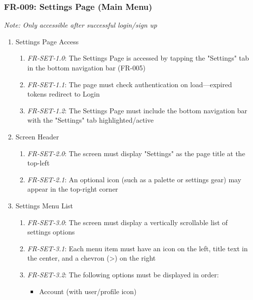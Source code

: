 \documentclass[conference]{IEEEtran}
\begin{document}
            \subsubsection{FR-009: Settings Page (Main Menu)}
                \textit{Note: Only accessible after successful login/sign up}
                \begin{enumerate}
                    \item Settings Page Access
                        \begin{enumerate}
                            \item \textit{FR-SET-1.0}: The Settings Page is accessed by tapping the "Settings" tab in the bottom navigation bar (FR-005)
                            \item \textit{FR-SET-1.1}: The page must check authentication on load—expired tokens redirect to Login
                            \item \textit{FR-SET-1.2}: The Settings Page must include the bottom navigation bar with the "Settings" tab highlighted/active
                        \end{enumerate}
                    \item Screen Header
                        \begin{enumerate}
                            \item \textit{FR-SET-2.0}: The screen must display "Settings" as the page title at the top-left
                            \item \textit{FR-SET-2.1}: An optional icon (such as a palette or settings gear) may appear in the top-right corner
                        \end{enumerate}
                    \item Settings Menu List
                        \begin{enumerate}
                            \item \textit{FR-SET-3.0}: The screen must display a vertically scrollable list of settings options
                            \item \textit{FR-SET-3.1}: Each menu item must have an icon on the left, title text in the center, and a chevron (>) on the right
                            \item \textit{FR-SET-3.2}: The following options must be displayed in order:
                                \begin{itemize}
                                    \item Account (with user/profile icon)

\end{itemize}
\end{enumerate}
\end{enumerate}
\end{document}
